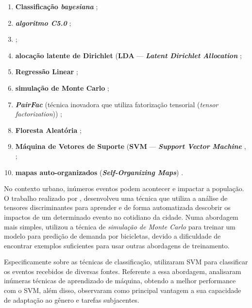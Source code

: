 \documentclass[
	12pt,				%
	oneside,			%
	a4paper,			%
	english,			%
	brazil				%
	]{abntex2ppgsi}
\begin{document}
{{{\begin{enumerate}
\item \textbf{Classificação \textit{bayesiana}} \cite{Mata2015};
\item \textit{\textbf{algoritmo C5.0}} \cite{Zagal2016};
\item {} \cite{Anantharam2015};
\item {} \textbf{alocação latente de Dirichlet}  {(\textbf{LDA} --- \textbf{\textit{Latent Dirichlet Allocation}}} \cite{Farseev2015, Abbasi2015, Hasan2014, DiLorenzo2013, Ni2016};
\item \textbf{Regressão Linear} \cite{Gutev2016, Bendler2014, Ni2016, Guo2016};
\item \textbf{simulação de Monte Carlo} \cite{Chen2016};
\item \textbf{\textit{PairFac}} (técnica inovadora que utiliza fatorização tensorial (\textit{tensor factorization})) \cite{Wen2016};
\item \textbf{Floresta Aleatória} \cite{Farseev2015};
\item {} {\textbf{Máquina de Vetores de Suporte} (\textbf{SVM} --- \textit{\textbf{Support Vector Machine}}} \cite{Mukherjee2015}, \cite{Gal-Tzur2014};
\item \textbf{mapas auto-organizados} (\textit{\textbf{Self-Organizing Maps}}) \cite{Frias-Martinez2014}.
\end{enumerate}

No contexto urbano, inúmeros eventos podem acontecer e impactar a população. O trabalho realizado por \cite{Wen2016}, desenvolveu uma técnica que utiliza a análise de tensores discriminantes para aprender e de forma automatizada descobrir os impactos de um determinado evento no cotidiano da cidade. Numa abordagem mais simples, \cite{Chen2016} utilizou a técnica de \textit{simulação de Monte Carlo} para treinar um modelo para predição de demanda por bicicletas, devido a dificuldade de encontrar exemplos suficientes para usar outras abordagens de treinamento. 

Especificamente sobre as técnicas de classificação, \cite{Mukherjee2015} utilizaram SVM para classificar os eventos recebidos de diversas fontes. Referente a essa abordagem, \cite{Gal-Tzur2014} analisaram inúmeras técnicas de aprendizado de máquina, obtendo a melhor performance com o SVM, além disso, observaram como principal vantagem a sua capacidade de adaptação ao gênero e tarefas subjacentes. 

}}}
\end{document}
